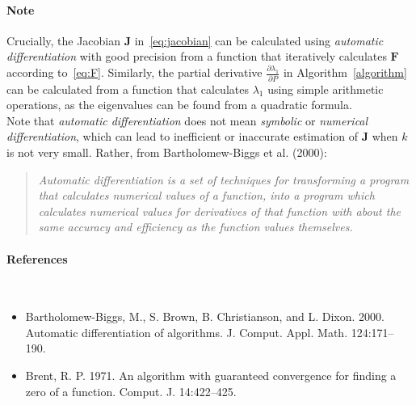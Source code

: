 \documentclass[11pt, oneside]{article}   	%
\let\vec\mathbf
\begin{document}
\paragraph{Note}
Crucially, the Jacobian $\vec{J}$ in~\autoref{eq:jacobian} can be calculated using \textit{automatic differentiation} with good precision from a function that iteratively calculates $\vec{F}$ according to~\autoref{eq:F}. Similarly, the partial derivative $\frac{\partial \lambda_1}{\partial P}$ in Algorithm~\autoref{algorithm} can be calculated from a function that calculates $\lambda_1$ using simple arithmetic operations, as the eigenvalues can be found from a quadratic formula.
\\
Note that \textit{automatic differentiation} does not mean \textit{symbolic} or \textit{numerical differentiation}, which can lead to inefficient or inaccurate estimation of $\vec{J}$ when $k$ is not very small. Rather, from Bartholomew-Biggs et al. (2000): 
\begin{quotation}\textit{
Automatic differentiation is a set of techniques for transforming a program that calculates numerical values of a function, into a program which calculates numerical values for derivatives of that function with about the same accuracy and efficiency as the function values themselves.
}\end{quotation}

\paragraph{References} ~\\
\begin{itemize}

\item Bartholomew-Biggs, M., S. Brown, B. Christianson, and L. Dixon. 2000. Automatic differentiation of algorithms. J. Comput. Appl. Math. 124:171–190.

\item Brent, R. P. 1971. An algorithm with guaranteed convergence for finding a zero of a function. Comput. J. 14:422–425.

\end{itemize}
\end{document}
